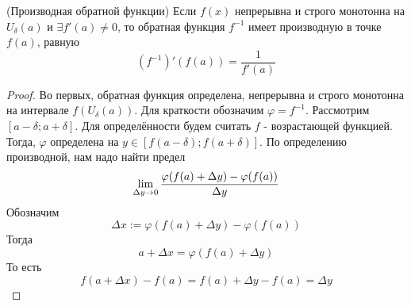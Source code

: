 \begin{theorem} (Производная обратной функции)
	Если $f(x)$ непрерывна и строго монотонна на $U_{\delta}(a)$ и $\exists f'(a) \neq 0$, то обратная функция $f^{-1}$ имеет производную в точке $f(a)$, равную
	$$
		(f^{-1})'(f(a)) = \frac{1}{f'(a)}
	$$
\end{theorem}

\begin{proof}
	Во первых, обратная функция определена, непрерывна и строго монотонна на интервале $f(U_{\delta}(a))$. Для краткости обозначим $\varphi = f^{-1}$. Рассмотрим $[a - \delta; a + \delta]$. Для определённости будем считать $f$ - возрастающей функцией. Тогда, $\varphi$ определена на $y \in [f(a - \delta); f(a + \delta)]$. По определению производной, нам надо найти предел
	$$
		\lim\limits_{\Delta y \to 0} \frac{\varphi(f(a) + \Delta y) - \varphi(f(a))}{\Delta y}
	$$
	Обозначим
	$$
		\Delta x := \varphi(f(a) + \Delta y) - \varphi(f(a))
	$$
	Тогда
	$$
		a + \Delta x = \varphi(f(a) + \Delta y)
	$$
	То есть
	$$
		f(a + \Delta x) - f(a) = f(a) + \Delta y - f(a) = \Delta y
	$$
\end{proof}